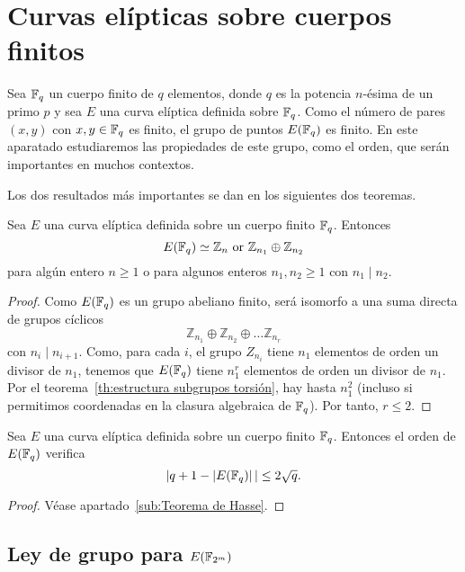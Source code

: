 \clearpage

\section{Curvas elípticas sobre cuerpos finitos}
\label{sec:Curvas elípticas sobre cuerpos finitos}

Sea $\mathbb{F}_q$ un cuerpo finito de $q$ elementos, donde $q$ es la potencia $n$-ésima de un primo $p$ y sea $E$ una curva elíptica definida sobre $\mathbb{F}_q$. Como el número de pares $(x, y)$ con $x, y \in \mathbb{F}_q$ es finito, el grupo de puntos $E(\mathbb{F}_q)$ es finito. En este aparatado estudiaremos las propiedades de este grupo, como el orden, que serán importantes en muchos contextos.

Los dos resultados más importantes se dan en los siguientes dos teoremas.

\begin{teorema}\label{th:estructura grupo puntos}
	Sea $E$ una curva elíptica definida sobre un cuerpo finito $\mathbb{F}_q$. Entonces
	$$
		E(\mathbb{F}_q) \simeq \mathbb{Z}_n \textrm{ or } \mathbb{Z}_{n_1} \oplus \mathbb{Z}_{n_2}
	$$
	para algún entero $n \ge 1$ o para algunos enteros $n_1, n_2 \ge 1$ con $n_1 \mid n_2$.
\end{teorema}
\begin{proof}
Como $E(\mathbb{F}_q)$ es un grupo abeliano finito, será isomorfo a una suma directa de grupos cíclicos
$$
	\mathbb{Z}_{n_1} \oplus \mathbb{Z}_{n_2} \oplus \dots \mathbb{Z}_{n_r}
$$
con $n_i \mid n_{i+1}$. Como, para cada $i$, el grupo $Z_{n_i}$ tiene $n_1$ elementos de orden un divisor de $n_1$, tenemos que $E(\mathbb{F}_q)$ tiene $n_1^r$ elementos de orden un divisor de $n_1$. Por el teorema~\ref{th:estructura subgrupos torsión}, hay hasta $n_1^2$ (incluso si permitimos coordenadas en la clasura algebraica de $\mathbb{F}_q$). Por tanto, $r \le 2$.
\end{proof}

\begin{teorema}\label{th:teorema de Hasse}
	Sea $E$ una curva elíptica definida sobre un cuerpo finito $\mathbb{F}_q$. Entonces el orden de $E(\mathbb{F}_q)$ verifica
	$$
		|q + 1 - \left\vert{E(\mathbb{F}_{q})}\right\vert| \le 2 \sqrt{q}.
	$$
\end{teorema}
\begin{proof}
	Véase apartado~\ref{sub:Teorema de Hasse}.
\end{proof}


\subsection{Ley de grupo para $E(\mathbb{F}_{2^m})$}
\label{sub:Ley de grupo para cuerpos base de característica 2}


